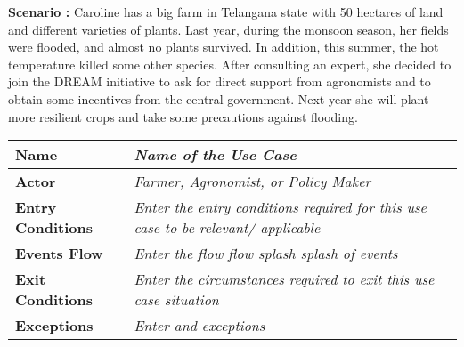 \begin{flushleft}
\textbf{Scenario :} 
Caroline has a big farm in Telangana state with 50 hectares of land and different varieties of plants. Last year, during the monsoon season, her fields were flooded, and almost no plants survived. In addition, this summer, the hot temperature killed some other species.
After consulting an expert, she decided to join the DREAM initiative to ask for direct support from agronomists and to obtain some incentives from the central government.
Next year she will plant more resilient crops and take some precautions against flooding.
\end{flushleft}

\begin{center}
\begin{tabular}{|l|>{\raggedright\arraybackslash}m{12cm}|}

    \hline
    \textbf{Name} & \textit{Name of the Use Case}\\
    \hline
   	\textbf{Actor} & \textit{Farmer, Agronomist, or Policy Maker}\\
    \hline
    \textbf{Entry Conditions} & \textit{Enter the entry conditions required for this use case to be relevant/ applicable}\\
    \hline
    \textbf{Events Flow} & \textit{Enter the flow flow splash splash of events}\\
    \hline
    \textbf{Exit Conditions} & \textit{Enter the circumstances required to exit this use case situation}\\
    \hline
    \textbf{Exceptions} & \textit{Enter and exceptions}\\
    \hline
\end{tabular}
\end{center}
